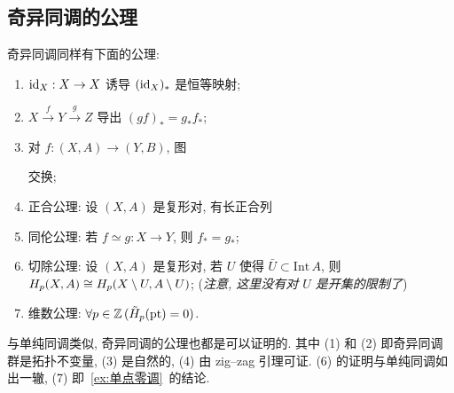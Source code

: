 \subsection{奇异同调的公理}

奇异同调同样有下面的公理:
\begin{enumerate}
	\item $ \mathrm{id}_X : X\to X $ 诱导 $ (\mathrm{id}_X)_* $ 是恒等映射;
	\item $ X\stackrel{f}{\to}Y\stackrel{g}{\to}Z $ 导出 $ (gf)_*=g_*f_* $;
	\item 对 $ f : (X,A)\to (Y,B) $, 图
	\begin{center}
	\end{center}
	交换;
	\item 正合公理: 设 $ (X,A) $ 是复形对, 有长正合列
	\begin{center}
	\end{center}
	\item 同伦公理: 若 $ f\simeq g : X\to Y $, 则 $ f_*=g_* $;
	\item 切除公理: 设 $ (X,A) $ 是复形对, 若 $ U $ 使得 $ \bar{U}\subset\mathrm{Int}\,A $, 则 $ H_p(X,A)\cong H_p(X\setminus U,A\setminus U) $; (\textit{注意, 这里没有对 $ U $ 是开集的限制了})
	\item 维数公理: $ \forall p\in\mathbb{Z}\,(\tilde{H}_p(\mathrm{pt})=0) $.
\end{enumerate}

与单纯同调类似, 奇异同调的公理也都是可以证明的. 其中 (1) 和 (2) 即奇异同调群是拓扑不变量, (3) 是自然的, (4) 由 zig--zag 引理可证. (6) 的证明与单纯同调如出一辙, (7) 即~\ref{ex:单点零调}~的结论.

